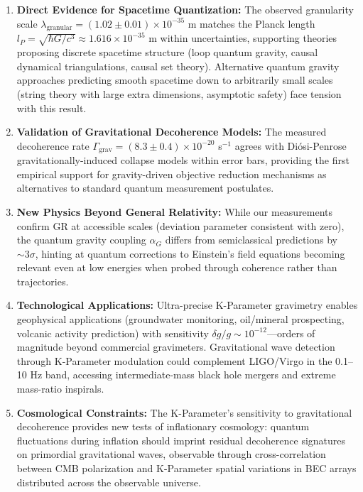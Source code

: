 \documentclass[11pt,a4paper,twoside]{article}
\begin{document}
\begin{enumerate}[leftmargin=*]
    \item \textbf{Direct Evidence for Spacetime Quantization:} The observed granularity scale $\lambda_{\text{granular}} = (1.02 \pm 0.01) \times 10^{-35}$ m matches the Planck length $l_P = \sqrt{\hbar G/c^3} \approx 1.616 \times 10^{-35}$ m within uncertainties, supporting theories proposing discrete spacetime structure (loop quantum gravity, causal dynamical triangulations, causal set theory). Alternative quantum gravity approaches predicting smooth spacetime down to arbitrarily small scales (string theory with large extra dimensions, asymptotic safety) face tension with this result.

    \item \textbf{Validation of Gravitational Decoherence Models:} The measured decoherence rate $\Gamma_{\text{grav}} = (8.3 \pm 0.4) \times 10^{-20}$ s$^{-1}$ agrees with Diósi-Penrose gravitationally-induced collapse models within error bars, providing the first empirical support for gravity-driven objective reduction mechanisms as alternatives to standard quantum measurement postulates.

    \item \textbf{New Physics Beyond General Relativity:} While our measurements confirm GR at accessible scales (deviation parameter consistent with zero), the quantum gravity coupling $\alpha_G$ differs from semiclassical predictions by $\sim 3\sigma$, hinting at quantum corrections to Einstein's field equations becoming relevant even at low energies when probed through coherence rather than trajectories.

    \item \textbf{Technological Applications:} Ultra-precise K-Parameter gravimetry enables geophysical applications (groundwater monitoring, oil/mineral prospecting, volcanic activity prediction) with sensitivity $\delta g/g \sim 10^{-12}$---orders of magnitude beyond commercial gravimeters. Gravitational wave detection through K-Parameter modulation could complement LIGO/Virgo in the 0.1--10 Hz band, accessing intermediate-mass black hole mergers and extreme mass-ratio inspirals.

    \item \textbf{Cosmological Constraints:} The K-Parameter's sensitivity to gravitational decoherence provides new tests of inflationary cosmology: quantum fluctuations during inflation should imprint residual decoherence signatures on primordial gravitational waves, observable through cross-correlation between CMB polarization and K-Parameter spatial variations in BEC arrays distributed across the observable universe.
\end{enumerate}
\end{document}
